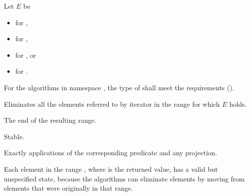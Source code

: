 \begin{itemdescr}
\pnum
Let $E$ be
\begin{itemize}
\item {} for ,
\item {} for ,
\item {} for , or
\item {} for .
\end{itemize}

\pnum
\requires
For the algorithms in namespace , the type of
shall meet the 
requirements ().

\pnum
\effects
Eliminates all the elements referred to by iterator
in the range 
for which $E$ holds.

\pnum
\returns
The end of the resulting range.

\pnum
\remarks Stable.

\pnum
\complexity
Exactly
applications of the corresponding predicate and any projection.

\pnum
\begin{note}
Each element in the range , where  is
the returned value, has a valid but unspecified state, because the algorithms
can eliminate elements by moving from elements that were originally
in that range.
\end{note}
\end{itemdescr}


